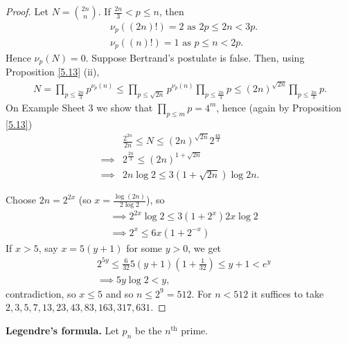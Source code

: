 \documentclass{article}
\theoremstyle{definition}
\begin{document}
\begin{proof}
    Let $N={{2n}\choose{n}}$. If $\frac{2n}{3}<p\le n$, then 
    \begin{align*}
        &\nu_p((2n)!) = 2 \text{ as } 2p\le 2n<3p. \\
        &\nu_p((n)!) = 1 \text{ as } p\le n<2p.
    \end{align*}
    Hence $\nu_p(N)=0$. Suppose Bertrand's postulate is false. Then, using Proposition \ref{5.13} (ii),
    \begin{align*}
        N = \prod_{p\le \frac{2n}{3}}^{} p^{\nu_p(n)} \le \prod_{p \le \sqrt{2n}}^{} p^{\nu_p(n)}\prod_{p\le \frac{2n}{3}}^{} p \le (2n)^{\sqrt{2n}} \prod_{p\le \frac{2n}{3}}^{} p.
    \end{align*}
    On Example Sheet 3 we show that $\prod_{p\le m}^{} p = 4^m$, hence (again by Proposition \ref{5.13})
    \begin{align*}
        &\frac{2^{2n}}{2n} \le N \le (2n)^{\sqrt{2n}} 2^{\frac{4n}{3}} \\
        \implies& 2^{\frac{2n}{3}} \le (2n)^{1+\sqrt{2n}} \\
        \implies& 2n \log 2 \le 3(1+\sqrt{2n})\log2n.
    \end{align*}


    Choose $2n=2^{2x}$ (so $x = \frac{\log(2n)}{2\log 2}$), so
    \begin{align*}
        &\implies 2^{2x}\log 2 \le 3(1+2^x)2x \log 2 \\
        &\implies 2^x \le 6x(1+2^{-x})
    \end{align*}
    If $x>5$, say $x=5(y+1)$ for some $y>0$, we get
    \begin{align*}
        &2^{5y} \le \frac{6}{32}5(y+1)(1+\frac{1}{32})\le y+1< e^y \\
        &\implies 5y \log 2 < y,
    \end{align*}
    contradiction, so $x\le 5$ and so $n\le 2^9 = 512$. For $n<512$ it suffices to take $2,3,5,7,13,23,43,83,163,317,631$.
\end{proof}
\vspace{1mm}

\textbf{Legendre's formula.} Let $p_n$ be the $n^{\text{th}}$ prime.
\end{document}
